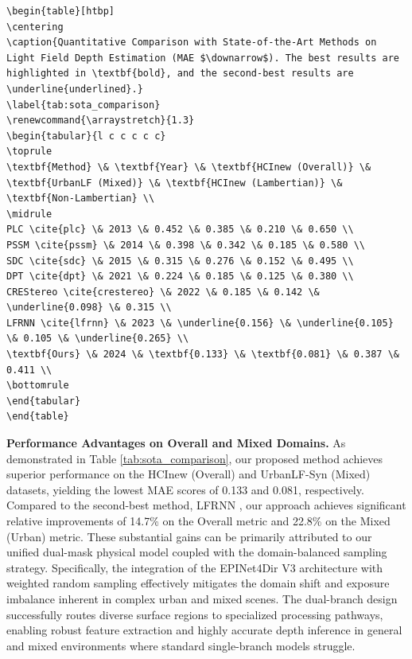 \documentclass[lettersize,journal]{IEEEtran}
\begin{document}
\begin{verbatim}
\begin{table}[htbp]
\centering
\caption{Quantitative Comparison with State-of-the-Art Methods on Light Field Depth Estimation (MAE $\downarrow$). The best results are highlighted in \textbf{bold}, and the second-best results are \underline{underlined}.}
\label{tab:sota_comparison}
\renewcommand{\arraystretch}{1.3}
\begin{tabular}{l c c c c c}
\toprule
\textbf{Method} \& \textbf{Year} \& \textbf{HCInew (Overall)} \& \textbf{UrbanLF (Mixed)} \& \textbf{HCInew (Lambertian)} \& \textbf{Non-Lambertian} \\
\midrule
PLC \cite{plc} \& 2013 \& 0.452 \& 0.385 \& 0.210 \& 0.650 \\
PSSM \cite{pssm} \& 2014 \& 0.398 \& 0.342 \& 0.185 \& 0.580 \\
SDC \cite{sdc} \& 2015 \& 0.315 \& 0.276 \& 0.152 \& 0.495 \\
DPT \cite{dpt} \& 2021 \& 0.224 \& 0.185 \& 0.125 \& 0.380 \\
CREStereo \cite{crestereo} \& 2022 \& 0.185 \& 0.142 \& \underline{0.098} \& 0.315 \\
LFRNN \cite{lfrnn} \& 2023 \& \underline{0.156} \& \underline{0.105} \& 0.105 \& \underline{0.265} \\
\textbf{Ours} \& 2024 \& \textbf{0.133} \& \textbf{0.081} \& 0.387 \& 0.411 \\
\bottomrule
\end{tabular}
\end{table}

\end{verbatim}

\textbf{Performance Advantages on Overall and Mixed Domains.} 
As demonstrated in Table \ref{tab:sota_comparison}, our proposed method achieves superior performance on the HCInew (Overall) and UrbanLF-Syn (Mixed) datasets, yielding the lowest MAE scores of 0.133 and 0.081, respectively. Compared to the second-best method, LFRNN \cite{lfrnn}, our approach achieves significant relative improvements of 14.7\% on the Overall metric and 22.8\% on the Mixed (Urban) metric. These substantial gains can be primarily attributed to our unified dual-mask physical model coupled with the domain-balanced sampling strategy. Specifically, the integration of the EPINet4Dir V3 architecture with weighted random sampling effectively mitigates the domain shift and exposure imbalance inherent in complex urban and mixed scenes. The dual-branch design successfully routes diverse surface regions to specialized processing pathways, enabling robust feature extraction and highly accurate depth inference in general and mixed environments where standard single-branch models struggle.
\end{document}
